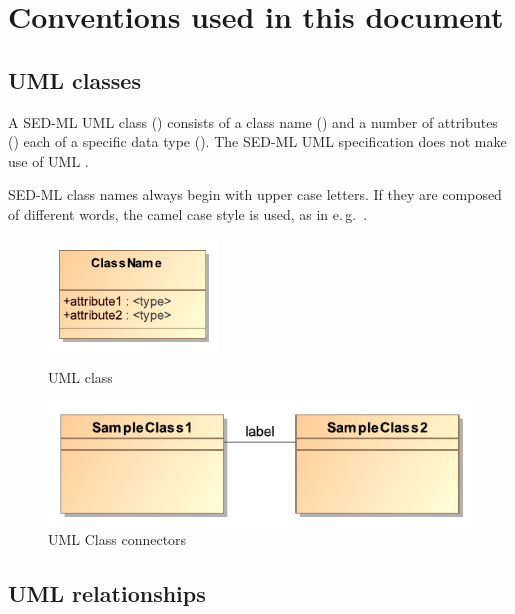 \section{Conventions used in this document}
\label{sec:conventions}

\subsection{UML classes}
A SED-ML UML class () consists of a class name () and a number of attributes () each of a specific data type (). The SED-ML UML specification does not make use of UML .

SED-ML class names always begin with upper case letters. If they are composed of different words, the camel case style is used, as in e.\,g.\ .

\begin{figure}[h]
\centering
\begin{minipage}{.5\textwidth}
	\centering
	\includegraphics[width=0.4\textwidth]{images/pdf/umlClass}
	\caption{UML class}
	\label{fig:umlClass}    
\end{minipage}%
\begin{minipage}{.5\textwidth}
	\centering
	\includegraphics[width=1.0\textwidth]{images/pdf/classRelation}
	\caption{UML Class connectors}
	\label{fig:umlConnectors}
\end{minipage}
\end{figure}

\subsection{UML relationships}
